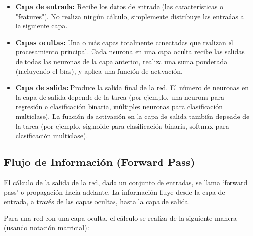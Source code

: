 \documentclass{article}
\begin{document}
\begin{itemize}
    \item \textbf{Capa de entrada:} Recibe los datos de entrada (las características o "features"). No realiza ningún cálculo, simplemente distribuye las entradas a la siguiente capa.
    \item \textbf{Capas ocultas:} Una o más capas totalmente conectadas que realizan el procesamiento principal.  Cada neurona en una capa oculta recibe las salidas de todas las neuronas de la capa anterior, realiza una suma ponderada (incluyendo el bias), y aplica una función de activación.
    \item \textbf{Capa de salida:} Produce la salida final de la red. El número de neuronas en la capa de salida depende de la tarea (por ejemplo, una neurona para regresión o clasificación binaria, múltiples neuronas para clasificación multiclase). La función de activación en la capa de salida también depende de la tarea (por ejemplo, sigmoide para clasificación binaria, softmax para clasificación multiclase).
\end{itemize}

\subsection{Flujo de Información (Forward Pass)}
El cálculo de la salida de la red, dado un conjunto de entradas, se llama `forward pass' o propagación hacia adelante.  La información fluye desde la capa de entrada, a través de las capas ocultas, hasta la capa de salida.

Para una red con una capa oculta, el cálculo se realiza de la siguiente manera (usando notación matricial):
\end{document}

